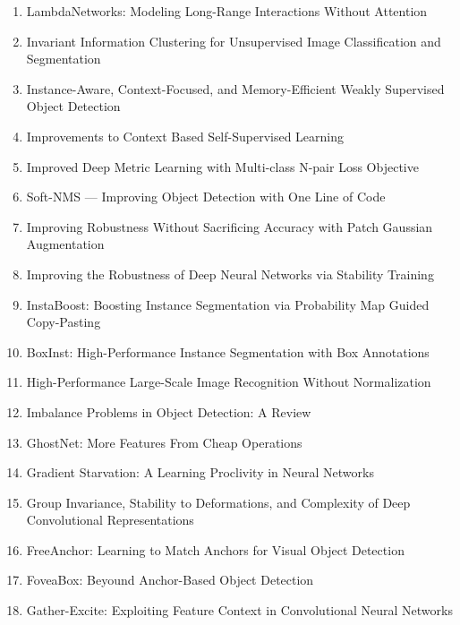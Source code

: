 \documentclass[acmlarge]{acmart}
\begin{document}
\begin{enumerate}
	\item LambdaNetworks: Modeling Long-Range Interactions Without Attention \cite{Bello2021LambdaNetworksML}
	\item Invariant Information Clustering for Unsupervised Image Classification and Segmentation \cite{Ji2019InvariantIC}
	\item Instance-Aware, Context-Focused, and Memory-Efficient Weakly Supervised Object Detection \cite{Ren2020InstanceAwareCA}
	\item Improvements to Context Based Self-Supervised Learning \cite{Mundhenk2018ImprovementsTC}
	\item Improved Deep Metric Learning with Multi-class N-pair Loss Objective \cite{Sohn2016ImprovedDM}
	\item Soft-NMS — Improving Object Detection with One Line of Code \cite{Bodla2017SoftNMSI}
	\item Improving Robustness Without Sacrificing Accuracy with Patch Gaussian Augmentation \cite{Lopes2019ImprovingRW}
	\item Improving the Robustness of Deep Neural Networks via Stability Training \cite{Zheng2016ImprovingTR}
	\item InstaBoost: Boosting Instance Segmentation via Probability Map Guided Copy-Pasting \cite{Fang2019InstaBoostBI}
	\item BoxInst: High-Performance Instance Segmentation with Box Annotations \cite{Tian2021BoxInstHI}
	\item High-Performance Large-Scale Image Recognition Without Normalization \cite{Brock2021HighPerformanceLI}
	\item Imbalance Problems in Object Detection: A Review \cite{Oksuz2021ImbalancePI}
	\item GhostNet: More Features From Cheap Operations \cite{Han2020GhostNetMF}
	\item Gradient Starvation: A Learning Proclivity in Neural Networks \cite{Pezeshki2020GradientSA}
	\item Group Invariance, Stability to Deformations, and Complexity of Deep Convolutional Representations \cite{Bietti2019GroupIS}
	\item FreeAnchor: Learning to Match Anchors for Visual Object Detection \cite{Zhang2019FreeAnchorLT}
	\item FoveaBox: Beyound Anchor-Based Object Detection \cite{Kong2020FoveaBoxBA}
	\item Gather-Excite: Exploiting Feature Context in Convolutional Neural Networks \cite{Hu2018GatherExciteEF}

\end{enumerate}
\end{document}
